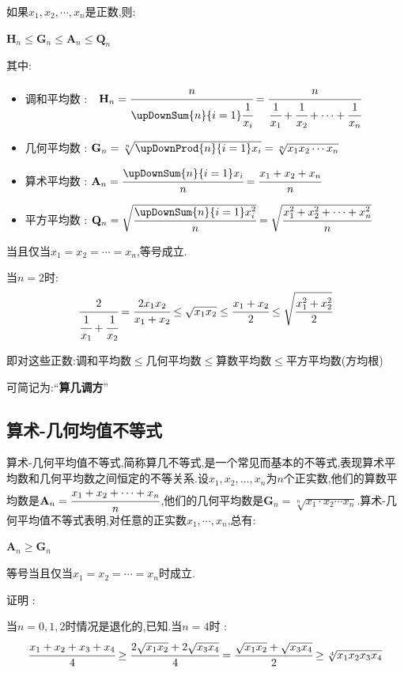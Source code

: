 {{{如果$x_{1},x_{2},\dotsm,x_{n}$是正数,则:

$\mathbf{H}_n \leq \mathbf{G}_n \leq \mathbf{A}_n \leq \mathbf{Q}_n$

其中:

\begin{itemize}
    \item 调和平均数 :　$\mathbf{H}_n = \cfrac{n}{\upDownSum{n}{i = 1}\cfrac{1}{x_i}} = \cfrac{n}{\cfrac{1}{x_1} + \cfrac{1}{x_2} + \dotsm + \cfrac{1}{x_n}}$
    \item 几何平均数 : $\mathbf{G}_n = \sqrt[n]{\upDownProd{n}{i = 1}x_i} = \sqrt[n]{x_1x_2\dotsm x_n}$
    \item 算术平均数 : $\mathbf{A}_n = \cfrac{\upDownSum{n}{i = 1}x_i}{n} = \cfrac{x_1 + x_2 + x_n}{n}$
    \item 平方平均数 : $\mathbf{Q}_n = \sqrt{\cfrac{\upDownSum{n}{i = 1}x^2_i}{n}} = \sqrt{\cfrac{x^2_1 + x^2_2 + \dotsm + x^2_n}{n}}$
\end{itemize}

当且仅当$x_1 = x_2 = \dotsm = x_n$,等号成立.

当$n = 2$时:$$
    \cfrac{2}{\cfrac{1}{x_1} + \cfrac{1}{x_2}} = \cfrac{2x_1x_2}{x_1 + x_2}\leq\sqrt{x_1x_2}\leq\cfrac{x_1 + x_2}{2}\leq\sqrt{\cfrac{x_1^2 + x_2^2}{2}}
$$

即对这些正数:调和平均数$\leq$几何平均数$\leq$算数平均数$\leq$平方平均数(方均根)

可简记为:“{\bfseries 算几调方}”
}%

\subsection{算术-几何均值不等式}{
    算术-几何平均值不等式,简称算几不等式,是一个常见而基本的不等式,表现算术平均数和几何平均数之间恒定的不等关系.设$x_1,x_2,\dots,x_n$为$n$个正实数,他们的算数平均数是$\mathbf{A}_n = \cfrac{x_1 + x_2 + \dotsm + x_n}{n}$,他们的几何平均数是$\mathbf{G}_n = \sqrt[n]{x_1\cdot x_2 \dotsm x_n}$.算术-几何平均值不等式表明,对任意的正实数$x_1,\dotsm,x_n$,总有:

    \begin{center}
        $\mathbf{A}_n\geq\mathbf{G}_n$
    \end{center}

    等号当且仅当$x_1 = x_2 = \dotsm = x_n$时成立.

    证明 :

    当$n = 0,1,2$时情况是退化的,已知.当$n = 4$时 : $$
        \cfrac{x_1 + x_2 + x_3 + x_4}{4} \geq \cfrac{2\sqrt{x_1x_2} + 2\sqrt{x_3x_4}}{4} = \cfrac{\sqrt{x_1x_2} + \sqrt{x_3x_4}}{2} \geq \sqrt[4]{x_1x_2x_3x_4}
    $$

}}}
